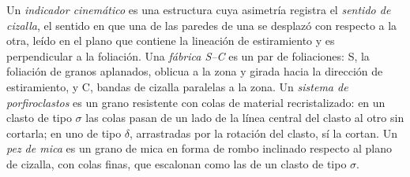 \begin{definition}\label{def:b3:deformation-mechanisms:kinematic}
Un \emph{indicador cinemático} es una estructura cuya
asimetría registra el \emph{sentido de cizalla}, el sentido en
que una de las paredes de una  se desplazó con respecto a la otra, leído en el plano
que contiene la lineación de estiramiento y es perpendicular a la foliación.
Una \emph{fábrica S--C} es un par de foliaciones: S, la
foliación de granos aplanados, oblicua a la zona y girada hacia la
dirección de estiramiento, y C, bandas de cizalla paralelas a la zona. Un
\emph{sistema de porfiroclastos} es un grano resistente con
colas de material recristalizado: en un clasto de tipo $\sigma$ las colas pasan de un
lado de la línea central del clasto al otro sin cortarla; en uno de tipo
$\delta$, arrastradas por la rotación del clasto, sí la cortan. Un
\emph{pez de mica} es un grano de mica en forma de rombo inclinado respecto al
plano de cizalla, con colas finas, que escalonan como las de un clasto de tipo $\sigma$.
\end{definition}

